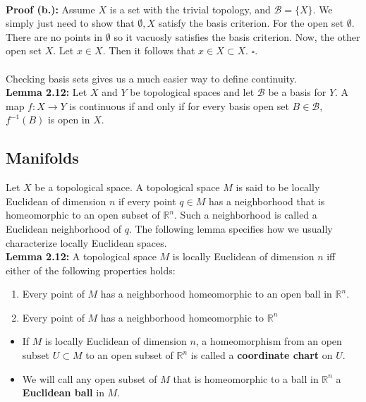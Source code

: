 \documentclass{article}
\begin{document}
\\
\textbf{Proof (b.):} Assume $X$ is a set with the trivial topology, and $\mathcal{B}=\{X\}$. We simply just need to show that $\emptyset, X$ satisfy the basis criterion. For the open set $\emptyset$. There are no points in $\emptyset$ so it vacuosly satisfies the basis criterion. Now, the other open set $X$. Let $x\in X$. Then it follows that $x\in X\subset X$. $\square$.\\
\\
Checking basis sets gives us a much easier way to define continuity.\\
\textbf{Lemma 2.12:} Let $X$ and $Y$ be topological spaces and let $\mathcal{B}$ be a basis for $Y$. A map $f:X\to Y$ is continuous if and only if for every basis open set $B\in \mathcal{B}$, $f^{-1}(B)$ is open in $X$.\\
\subsection{Manifolds}
Let $X$ be a topological space. A topological space $M$ is said to be locally Euclidean of dimension $n$ if every point $q\in M$ has a neighborhood that is homeomorphic to an open subset of $\mathbb{R}^n$. Such a neighborhood is called a Euclidean neighborhood of $q$. The following lemma specifies how we usually characterize locally Euclidean spaces.\\
\textbf{Lemma 2.12:} A topological space $M$ is locally Euclidean of dimension $n$ iff either of the following properties holds:
\begin{enumerate}[label=[(\alph*.)]
    \item Every point of $M$ has a neighborhood homeomorphic to an open ball in $\mathbb{R}^n$.
    \item Every point of $M$ has a neighborhood homeomorphic to $\mathbb{R}^n$
\end{enumerate}
\begin{itemize}
    \item If $M$ is locally Euclidean of dimension $n$, a homeomorphism from an open subset $U\subset M$ to an open subset of $\mathbb{R}^n$ is called a \textbf{coordinate chart} on $U$.
    \item We will call any open subset of $M$ that is homeomorphic to a ball in $\mathbb{R}^n$ a \textbf{Euclidean ball} in $M$.
\end{itemize}
\end{document}
